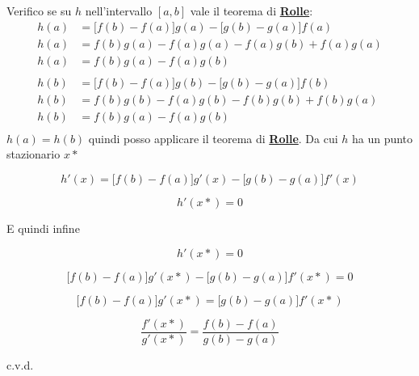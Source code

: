 \documentclass[../dimostrazioni]{subfiles}
\begin{document}
            Verifico se su \(h\) nell'intervallo \([a,b]\) vale il teorema di \textbf{\hyperref[teoRolle]{Rolle}}:
            \begin{align*}
                h(a)&=\big[f(b) - f(a)\big]g(a) - \big[g(b) - g(a)\big]f(a)\\
                h(a)&=f(b)g(a) - f(a)g(a) - f(a)g(b) + f(a)g(a)\\
                h(a)&=f(b)g(a) - f(a)g(b)\\
                \\
                h(b)&=\big[f(b) - f(a)\big]g(b) - \big[g(b) - g(a)\big]f(b)\\
                h(b)&=f(b)g(b) - f(a)g(b) - f(b)g(b) + f(b)g(a)\\
                h(b)&=f(b)g(a) - f(a)g(b)\\
            \end{align*}
            \(h(a)=h(b)\) quindi posso applicare il teorema di \textbf{\hyperref[teoRolle]{Rolle}}. Da cui \(h\) ha un punto stazionario \(x*\)

            \[    h'(x) = \big[f(b) - f(a)\big]g'(x) - \big[g(b) - g(a)\big]f'(x) \]
            
            \[    h'(x*) = 0 \]

            E quindi infine

            \[  h'(x*) = 0 \]
            
            \[  \big[f(b) - f(a)\big]g'(x*) - \big[g(b) - g(a)\big]f'(x*) = 0 \]

            \[  \big[f(b) - f(a)\big]g'(x*) = \big[g(b) - g(a)\big]f'(x*) \]
            
            \[  \frac{ f'(x*) }{ g'(x*) } = \frac{ f(b) - f(a) }{ g(b) - g(a) } \]
            
            c.v.d.
\end{document}
